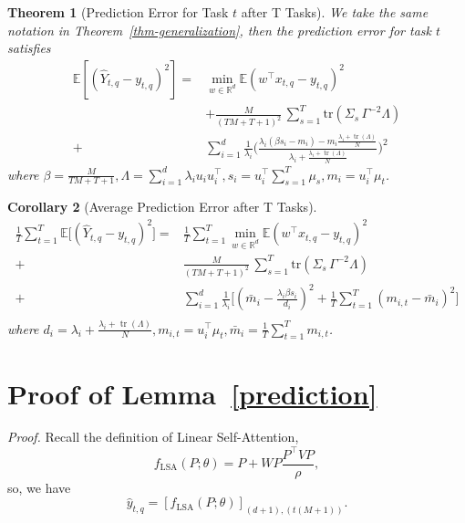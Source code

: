 \documentclass{article}
\theoremstyle{plain}
\newtheorem{theorem}{Theorem}[section]
\newtheorem{corollary}[theorem]{Corollary}
\theoremstyle{definition}
\theoremstyle{remark}
\begin{document}
\begin{theorem}[Prediction Error for Task $t$ after T Tasks]
We take the same notation in Theorem~\ref{thm-generalization}, then the prediction error for task $t$ satisfies
\[
\begin{aligned}
\mathbb{E}[(\hat Y_{t,q}-y_{t,q})^2]
=&\min_{w\in\mathbb{R}^d} \mathbb{E}(w^\top x_{t,q} - y_{t,q})^2 \\&+\frac{M}{(TM+T+1)^2}\,\sum_{s=1}^T\mathrm{tr}(\Sigma_s\,\Gamma^{-2}\Lambda)\\
+&\sum_{i=1}^d \frac{1}{\lambda_i}\Big(\frac{\lambda_i(\beta s_i - m_i) - m_i\frac{\lambda_i + \operatorname{tr}(\Lambda)}{N}}{\lambda_i + \frac{\lambda_i + \operatorname{tr}(\Lambda)}{N}} \Big)^2
\end{aligned}
\]
where $\beta=\frac{M}{TM+T+1}, \Lambda =\sum_{i=1}^d\lambda_i u_iu_i^\top,s_i = u_i^\top\sum_{s=1}^T\mu_s,m_i = u_i^\top\mu_t$.
\end{theorem}

\begin{corollary}[Average Prediction Error after T Tasks]
\label{ave_pre}
\[
\begin{aligned}
\frac{1}{T}\sum_{t=1}^T 
\mathbb{E}\big[(\hat{Y}_{t,q}-y_{t,q})^2\big]
=&\frac{1}{T}\sum_{t=1}^T\min_{w\in\mathbb{R}^d} \mathbb{E}(w^\top x_{t,q} - y_{t,q})^2\\ +&\frac{M}{(TM+T+1)^2}\,\sum_{s=1}^T\mathrm{tr}(\Sigma_s\,\Gamma^{-2}\Lambda)\\
+&\sum_{i=1}^d \frac{1}{\lambda_i}\Big[(\bar{m}_i - \frac{\lambda_i\beta s_i}{d_i})^2 + \frac{1}{T}\sum_{t=1}^T(m_{i,t} - \bar{m}_i)^2\Big]\\
\end{aligned}
\]
where $d_i = \lambda_i + \frac{\lambda_i+\operatorname{tr}(\Lambda)}{N}, m_{i,t} = u_i^\top\mu_t,\bar{m}_i = \frac{1}{T}\sum_{t=1}^Tm_{i,t}$.
\end{corollary}


\vspace{-0.1in}\section{Proof of Lemma~\ref{prediction}}
\label{lemma4.1}
\textit{Proof.} 
Recall the definition of Linear Self-Attention,
\[
f_{\mathrm{LSA}}(P;\theta)
= P + WP\frac{P^\top VP}{\rho},
\]
so, we have
\[
\hat{y}_{t,q} = [f_{\mathrm{LSA}}(P;\theta)]_{(d+1),(t(M+1))}.
\]
\end{document}
